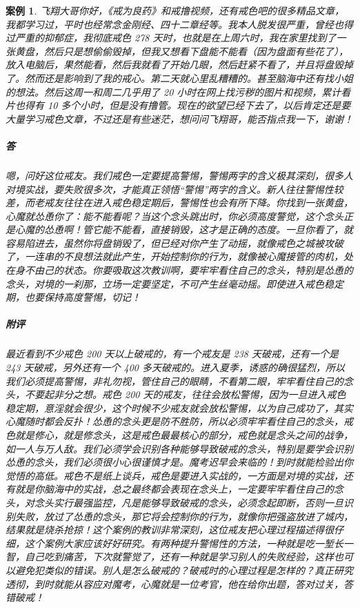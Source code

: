 \documentclass{ctexart}
\newtheorem{case}{案例}
\begin{document}
\begin{case}
    飞翔大哥你好，《戒为良药》和戒撸视频，还有戒色吧的很多精品文章，我都学习过，平时也经常念金刚经、四十二章经等。我本人脱发很严重，曾经也得过严重的抑郁症，我彻底戒色 278 天时，也就是在上周六时，我在家里找到了一张黄盘，然后只是想偷偷毁掉，但我又想看下盘能不能看（因为盘面有些花了），放入电脑后，果然能看，然后我就看了开始几眼，然后赶紧不看了，并且将盘毁掉了。然而还是影响到了我的戒心。第二天就心里乱糟糟的。甚至脑海中还有找小姐的想法。然后这周一和周二几乎用了 20 小时在网上找污秽的图片和视频，累计看片也得有 10 多个小时，但是没有撸管。现在的欲望已经下去了，以后肯定还是要大量学习戒色文章，不过还是有些迷茫，想问问飞翔哥，能否指点我一下，谢谢！
    \subparagraph{答} 嗯，问好这位戒友。我们戒色一定要提高警惕，警惕两字的含义极其深刻，很多人对境实战，要失败很多次，才能真正领悟“警惕”两字的含义。新人往往警惕性较差，而老戒友往往在进入戒色稳定期后，警惕性也会有所下降。你找到一张黄盘，心魔就怂恿你了：能不能看呢？当这个念头跳出时，你必须高度警觉，这个念头正是心魔的怂恿啊！管它能不能看，直接销毁，这才是正确的态度。一旦你看了，就容易陷进去，虽然你将盘销毁了，但已经对你产生了动摇，就像戒色之城被攻破了，一连串的不良想法就此产生，开始控制你的行为，就像被心魔接管的肉机，处在身不由己的状态。你要吸取这次教训啊，要牢牢看住自己的念头，特别是怂恿的念头，对境的一刹那，立场一定要坚定，不可产生丝毫动摇。即使进入戒色稳定期，也要保持高度警惕，切记！
    \subparagraph{附评} 最近看到不少戒色 200 天以上破戒的，有一个戒友是 238 天破戒，还有一个是 243 天破戒，另外还有一个 400 多天破戒的。进入夏季，诱惑的确很猛烈，所以我们必须提高警惕，非礼勿视，管住自己的眼睛，不看第二眼，牢牢看住自己的念头，不要起非分之想。戒色 200 天的戒友，往往会放松警惕，因为一旦进入戒色稳定期，意淫就会很少，这个时候不少戒友就会放松警惕，以为自己成功了，其实心魔随时都会反扑！怂恿的念头更是防不胜防，所以必须牢牢看住自己的念头，戒色就是修心，就是修念头，这是戒色最最核心的部分，戒色就是念头之间的战争，如一人与万人敌。我们必须学会识别各种能够导致破戒的念头，特别是要学会识别怂恿的念头，我们必须很小心很谨慎才是。魔考迟早会来临的！到时就能检验出你觉悟的高低。戒色不是纸上谈兵，戒色是要进入实战的，一方面是对境的实战，还有就是你脑海中的实战，总之最终都会表现在念头上，一定要牢牢看住自己的念头，对念头实行最强监控，凡是能够导致破戒的念头，必须念起即断，否则一旦识别失败，放过了怂恿的念头，那它将会控制你的行为，就像你把强盗放进了城内，结果就是烧杀抢掠！这个案例的教训非常深刻，这位戒友把心理过程描述得很仔细，这个案例大家应该好好研究。有两种提升警惕性的方法，一种就是吃一堑长一智，自己吃到痛苦，下次就警觉了，还有一种就是学习别人的失败经验，这样也可以避免犯类似的错误。别人是怎么破戒的？破戒时的心理过程是怎样的？真正研究透彻，到时就能从容应对魔考，心魔就是一位考官，他在给你出题，答对过关，答错破戒！
\end{case}
\end{document}
